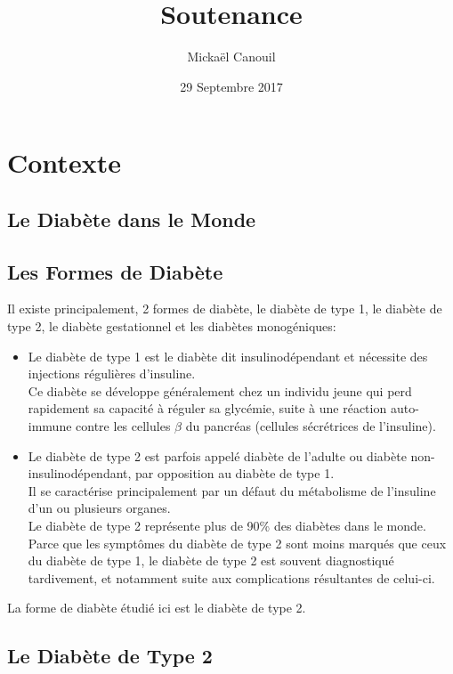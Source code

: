 \documentclass[11pt]{article} %
\title{Soutenance}
\author{Mickaël Canouil}
\date{29 Septembre 2017} %
\begin{document}
\maketitle

\section{Contexte}
\subsection{Le Diabète dans le Monde}
\par{}

\subsection{Les Formes de Diabète}
\par{Il existe principalement, 2 formes de diabète, le diabète de type 1, le diabète de type 2, le diabète gestationnel et les diabètes monogéniques:}
\par{
    \begin{itemize}
        \item Le diabète de type 1 est le diabète dit insulinodépendant et nécessite des injections régulières d’insuline. \\
            Ce diabète se développe généralement chez un individu jeune qui perd rapidement sa capacité à réguler sa glycémie, suite à une réaction auto-immune contre les cellules $\beta$ du pancréas (cellules sécrétrices de l’insuline).
        \item Le diabète de type 2 est parfois appelé diabète de l’adulte ou diabète non-insulinodépendant, par opposition au diabète de type 1. \\
            Il se caractérise principalement par un défaut du métabolisme de l’insuline d'un ou plusieurs organes. \\
            Le diabète de type 2 représente plus de 90\% des diabètes dans le monde. \\
            Parce que les symptômes du diabète de type 2 sont moins marqués que ceux du diabète de type 1, le diabète de type 2 est souvent diagnostiqué tardivement, et notamment suite aux complications résultantes de celui-ci.
    \end{itemize}
}
\par{La forme de diabète étudié ici est le diabète de type 2.}

\subsection{Le Diabète de Type 2}
\par{}
\end{document}
